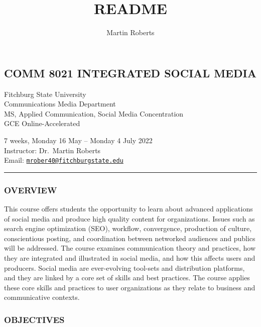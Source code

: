 \documentclass[]{tufte-handout}
\title{README}
\author{Martin Roberts}
\date{}
\begin{document}
\maketitle




\hypertarget{comm-8021-integrated-social-media}{%
\subsection{COMM 8021 INTEGRATED SOCIAL
MEDIA}\label{comm-8021-integrated-social-media}}

Fitchburg State University\\
Communications Media Department\\
MS, Applied Communication, Social Media Concentration\\
GCE Online-Accelerated

7 weeks, Monday 16 May -- Monday 4 July 2022\\
Instructor: Dr.~Martin Roberts\\
Email:
\href{mailto:mrober40@fitchburgstate.edu}{\nolinkurl{mrober40@fitchburgstate.edu}}

\begin{center}\rule{0.5\linewidth}{0.5pt}\end{center}

\hypertarget{overview}{%
\subsubsection{OVERVIEW}\label{overview}}

This course offers students the opportunity to learn about advanced
applications of social media and produce high quality content for
organizations. Issues such as search engine optimization (SEO),
workflow, convergence, production of culture, conscientious posting, and
coordination between networked audiences and publics will be addressed.
The course examines communication theory and practices, how they are
integrated and illustrated in social media, and how this affects users
and producers. Social media are ever-evolving tool-sets and distribution
platforms, and they are linked by a core set of skills and best
practices. The course applies these core skills and practices to user
organizations as they relate to business and communicative contexts.

\hypertarget{objectives}{%
\subsubsection{OBJECTIVES}\label{objectives}}
\end{document}
